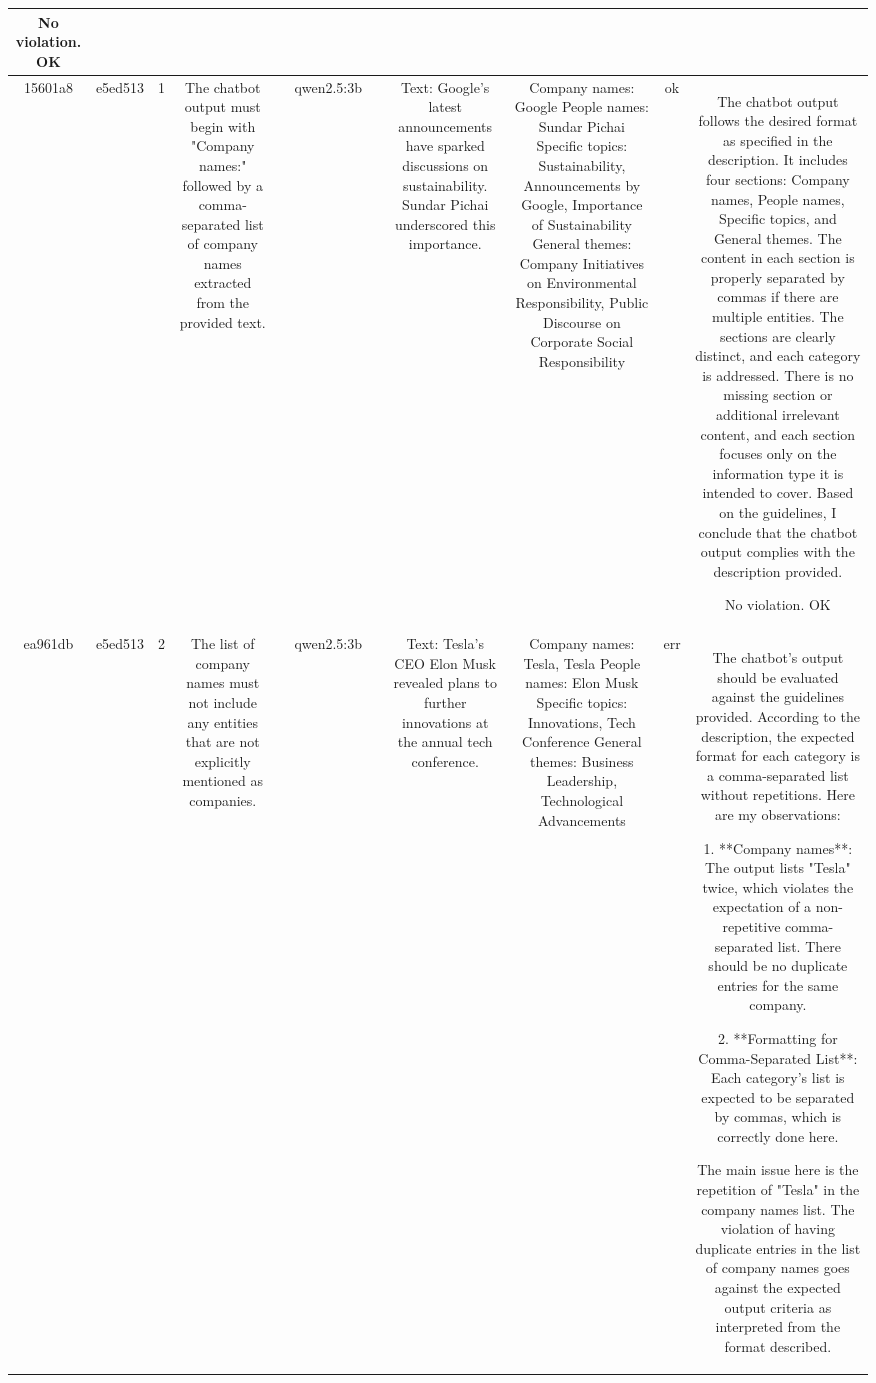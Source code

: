 \begin{table}[h!]
\begin{tabular}{|c|c|c|c|c|c|c|c|c|c|c|}
No violation.
OK\\
\hline
15601a8 & e5ed513 & 1 & The chatbot output must begin with "Company names:" followed by a comma-separated list of company names extracted from the provided text. &  & qwen2.5:3b &  & Text: Google's latest announcements have sparked discussions on sustainability. Sundar Pichai underscored this importance. & Company names: Google
People names: Sundar Pichai
Specific topics: Sustainability, Announcements by Google, Importance of Sustainability
General themes: Company Initiatives on Environmental Responsibility, Public Discourse on Corporate Social Responsibility & ok & The chatbot output follows the desired format as specified in the description. It includes four sections: Company names, People names, Specific topics, and General themes. The content in each section is properly separated by commas if there are multiple entities. The sections are clearly distinct, and each category is addressed. There is no missing section or additional irrelevant content, and each section focuses only on the information type it is intended to cover. Based on the guidelines, I conclude that the chatbot output complies with the description provided.

No violation.
OK\\
\hline
ea961db & e5ed513 & 2 & The list of company names must not include any entities that are not explicitly mentioned as companies. &  & qwen2.5:3b &  & Text: Tesla's CEO Elon Musk revealed plans to further innovations at the annual tech conference. & Company names: Tesla, Tesla
People names: Elon Musk
Specific topics: Innovations, Tech Conference
General themes: Business Leadership, Technological Advancements & err & The chatbot's output should be evaluated against the guidelines provided. According to the description, the expected format for each category is a comma-separated list without repetitions. Here are my observations:

1. **Company names**: The output lists "Tesla" twice, which violates the expectation of a non-repetitive comma-separated list. There should be no duplicate entries for the same company.

2. **Formatting for Comma-Separated List**: Each category's list is expected to be separated by commas, which is correctly done here.

The main issue here is the repetition of "Tesla" in the company names list. The violation of having duplicate entries in the list of company names goes against the expected output criteria as interpreted from the format described.


\end{tabular}
\end{table}

